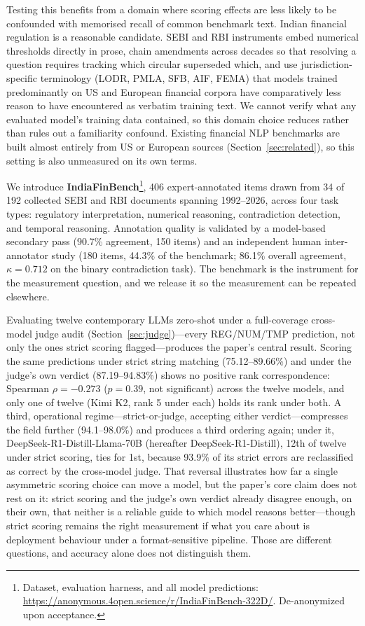 Testing this benefits from a domain where scoring effects are less likely to be confounded with
memorised recall of common benchmark text. Indian financial regulation is a reasonable candidate.
SEBI and RBI instruments embed numerical thresholds directly in prose, chain amendments across
decades so that resolving a question requires tracking which circular superseded which, and use
jurisdiction-specific terminology (LODR, PMLA, SFB, AIF, FEMA) that models trained predominantly on
US and European financial corpora have comparatively less reason to have encountered as verbatim
training text. We cannot verify what any evaluated model's training data contained, so this domain
choice reduces rather than rules out a familiarity confound. Existing financial NLP benchmarks are
built almost entirely from US or European sources (Section~\ref{sec:related}), so this setting is
also unmeasured on its own terms.

We introduce \textbf{IndiaFinBench}\footnote{Dataset, evaluation harness, and all model
predictions: \url{https://anonymous.4open.science/r/IndiaFinBench-322D/}. De-anonymized upon
acceptance.}, 406 expert-annotated items drawn from 34 of 192 collected SEBI and RBI
documents spanning 1992--2026, across four task types: regulatory interpretation, numerical
reasoning, contradiction detection, and temporal reasoning. Annotation quality is validated by a
model-based secondary pass (90.7\% agreement, 150 items) and an independent human
inter-annotator study (180 items, 44.3\% of the benchmark; 86.1\% overall agreement,
$\kappa = 0.712$ on the binary contradiction task). The benchmark is the instrument for the
measurement question, and we release it so the measurement can be repeated elsewhere.

Evaluating twelve contemporary LLMs zero-shot under a full-coverage cross-model judge audit
(Section~\ref{sec:judge})---every REG/NUM/TMP prediction, not only the ones strict scoring
flagged---produces the paper's central result. Scoring the same predictions under strict string
matching (75.12--89.66\%) and under the judge's own verdict (87.19--94.83\%) shows no positive rank
correspondence: Spearman $\rho = -0.273$ ($p = 0.39$, not significant) across the twelve models, and only
one of twelve (Kimi K2, rank 5 under each) holds its rank under both. A third, operational regime---strict-or-judge, accepting either
verdict---compresses the field further (94.1--98.0\%) and produces a third ordering again; under it,
DeepSeek-R1-Distill-Llama-70B (hereafter DeepSeek-R1-Distill), 12th of twelve under strict scoring,
ties for 1st, because 93.9\% of its strict errors are reclassified as correct by the cross-model
judge. That reversal illustrates how far a single asymmetric scoring choice can move a model, but
the paper's core claim does not rest on it: strict scoring and the judge's own verdict already
disagree enough, on their own, that neither is a reliable guide to which model reasons
better---though strict scoring remains the right measurement if what you care about is deployment
behaviour under a format-sensitive pipeline. Those are different questions, and accuracy alone does
not distinguish them.


